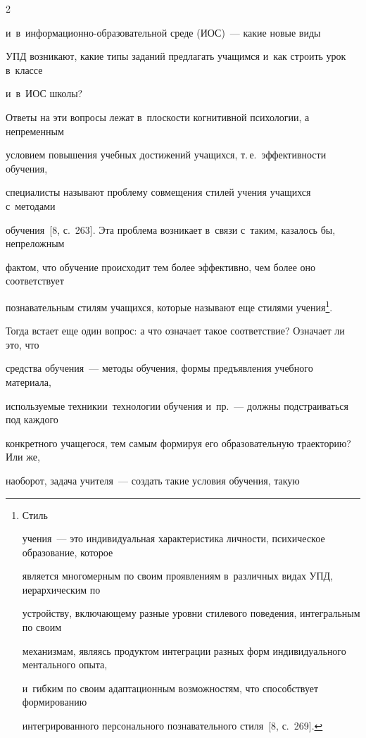 \begin{multicols}{2}
\begin{itemize}
и~в~ин\-фор\-ма\-ци\-он\-но-обра\-зо\-ва\-тель\-ной среде (ИОС)~--- какие новые виды


УПД возникают, какие типы заданий предлагать учащимся и~как строить урок в~классе


и~в~ИОС школы?


\end{itemize}





   Ответы на эти вопросы лежат в~плоскости когнитивной психологии, а непременным


условием повышения учебных достижений учащихся, т.\,е.\ эффективности обучения,


специалисты называют проблему совмещения стилей учения учащихся с~методами


обучения~[8, с.~263]. Эта проблема возникает в~связи с~таким, казалось бы, непреложным


фактом, что обучение происходит тем более эффективно, чем более оно соответствует


познавательным стилям учащихся, которые называют еще стилями учения\footnote{Стиль


учения~--- это индивидуальная характеристика личности, психическое образование, которое


является многомерным по своим проявлениям в~различных видах УПД, иерархическим по


устройству, включающему разные уровни стилевого поведения, интегральным по своим


механизмам, являясь продуктом интеграции разных форм индивидуального ментального опыта,


и~гибким по своим адаптационным возможностям, что способствует формированию


интегрированного персонального познавательного стиля~[8, с.~269].}.





   Тогда встает еще один вопрос: а что означает такое соответствие? Означает ли это, что


средства обучения~--- методы обучения, формы предъявления учебного материала,


используемые техники\linebreak и~технологии обучения и~пр.~--- должны подстраиваться под каждого


конкретного учащегося, тем самым формируя его образовательную траекторию? Или же,


наоборот, задача учителя~--- создать такие условия обучения, такую



\end{multicols}
